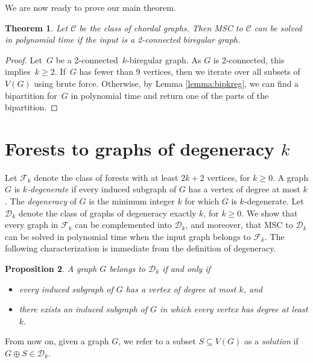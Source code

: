 \documentclass[11pt]{article}
\newtheorem{theorem}{Theorem}
\newtheorem{proposition}[theorem]{Proposition}
\theoremstyle{definition}
\begin{document}
We are now ready to prove our main theorem.
    
\begin{theorem}
\label{thm:biregular-chordal}
Let $\mathcal{C}$ be the class of chordal graphs.  
Then MSC to $\mathcal{C}$ can be solved in polynomial time if the input is a 2-connected biregular graph.
\end{theorem}
\begin{proof}
    Let~$G$ be a 2-connected~$k$-biregular graph. 
    As $G$ is 2-connected, this implies~$k\geq 2$.
    If~$G$ has fewer than 9 vertices, then we iterate over all subsets of~$V(G)$ using brute force. Otherwise, by Lemma \ref{lemma:bipkreg}, we can find a bipartition for~$G$ in polynomial time and return one of the parts of the bipartition.
\end{proof}




\section{Forests to graphs of degeneracy $k$}
\label{section:forest-deg-k}
Let $\mathcal{F}_k$ denote the class of forests with at least $2k+2$ vertices, for $k \geq 0$.
A graph $G$ is \emph{$k$-degenerate} if every induced subgraph of $G$
has a vertex of degree at most $k$.
The \emph{degeneracy} of $G$ is the minimum integer $k$ for which $G$ is $k$-degenerate.
Let $\mathcal{D}_k$ denote the class of graphs of degeneracy exactly $k$, for $k \geq 0$.
We show that every graph in $\mathcal{F}_k$ can be complemented into $\mathcal{D}_k$,
and moreover, that MSC to $\mathcal{D}_k$ can be solved in polynomial time
when the input graph belongs to $\mathcal{F}_k$.
The following characterization is immediate from the definition of degeneracy.

\begin{proposition} \label{prop:GinmathcalD_kthenaandb}
A graph $G$ belongs to $\mathcal{D}_k$ if and only if
\begin{itemize}
    \item[(a)] every induced subgraph of $G$ has a vertex of degree at most $k$, and
    \item[(b)] there exists an induced subgraph of $G$ in which every vertex has degree at least $k$.
\end{itemize}
\end{proposition}

From now on, given a graph $G$, we refer to a subset $S \subseteq V(G)$
as a \emph{solution} if $G \oplus S \in \mathcal{D}_k$.
\end{document}
